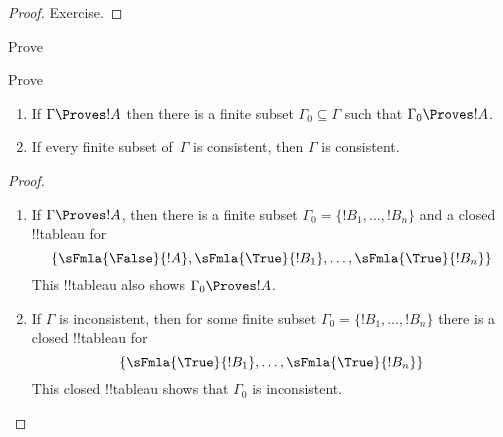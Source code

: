 \documentclass[../../../include/open-logic-section]{subfiles}
\begin{document}
\begin{proof}
Exercise.
\end{proof}

\begin{prob}
Prove 
\end{prob}
\tagendprob

\begin{prob}
Prove 
\end{prob}
\tagendprob

\begin{prop}[Compactness]
  \begin{enumerate}
  \item If $\Gamma \Proves !A$ then there is a finite subset $\Gamma_0
    \subseteq \Gamma$ such that $\Gamma_0 \Proves !A$.
  \item If every finite subset of~$\Gamma$ is
    consistent, then $\Gamma$ is consistent.
  \end{enumerate}
\end{prop}

\begin{proof}
  \begin{enumerate}
    \item If $\Gamma \Proves !A$, then there is a finite subset
      $\Gamma_0 = \{!B_1, \dots, !B_n\}$ and a closed !!{tableau} for
      \[
      \{\sFmla{\False}{!A}, \sFmla{\True}{!B_1}, \dots, \sFmla{\True}{!B_n}\}
      \]
      This !!{tableau} also shows $\Gamma_0 \Proves !A$.
    \item If $\Gamma$ is inconsistent, then for some finite subset
      $\Gamma_0 = \{!B_1, \dots, !B_n\}$ there is a closed !!{tableau}
      for
      \[
      \{\sFmla{\True}{!B_1}, \dots, \sFmla{\True}{!B_n}\}
      \]
      This closed !!{tableau} shows that $\Gamma_0$ is inconsistent.
  \end{enumerate}
\end{proof}
\end{document}
